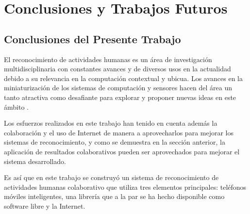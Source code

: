
\chapter{Conclusiones y Trabajos Futuros}

\label{cap8:conclusiones-y-trabajos-futuros}

\section{Conclusiones del Presente Trabajo}

\label{sec81:conclusiones}El reconocimiento de actividades humanas
es un área de investigación multidisciplinaria con constantes avances
y de diversos usos en la actualidad debido a su relevancia en la computación
contextual y ubicua. Los avances en la miniaturización de los sistemas
de computación y sensores hacen del área un tanto atractiva como desafiante
para explorar y proponer nuevas ideas en este ámbito \cite{LaraLabrador2013}. 

Los esfuerzos realizados en este trabajo han tenido en cuenta además
la colaboración y el uso de Internet de manera a aprovecharlos para
mejorar los sistemas de reconocimiento, y como se demuestra en la
sección anterior, la aplicación de resultados colaborativos pueden
ser aprovechados para mejorar el sistema desarrollado. 

Es así que en este trabajo se construyó un sistema de reconocimiento
de actividades humanas colaborativo que utiliza tres elementos principales:
teléfonos móviles inteligentes, una librería que a la par se ha hecho
disponible como software libre y la Internet. 

